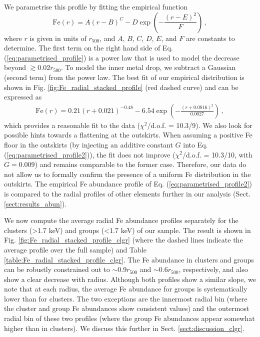 \documentclass{aa}
\begin{document}
We parametrise this profile by fitting the empirical function
\begin{equation}
\label{eq:parametrised_profile}
\text{Fe}(r) = A (r-B)^{C} - D \exp \left( -\frac{(r-E)^2}{F} \right) \, ,
\end{equation}
where $r$ is given in units of $r_{500}$, and $A$, $B$, $C$, $D$, $E$, and $F$ are constants to determine. The first term on the right hand side of Eq. (\ref{eq:parametrised_profile}) is a power law that is used to model the decrease beyond $\gtrsim$0.02$r_{500}$. To model the inner metal drop, we subtract a Gaussian (second term) from the power law. The best fit of our empirical distribution is shown in Fig. \ref{fig:Fe_radial_stacked_profile} (red dashed curve) and can be expressed as
\begin{align}
\label{eq:parametrised_profile2}
\text{Fe}(r) = 0.21 (r+0.021)^{-0.48} - 6.54 \exp \left( -\frac{(r+0.0816)^2}{0.0027} \right) \, ,
\end{align}
which provides a reasonable fit to the data ($\chi^2$/d.o.f. = 10.3/9). We also look for possible hints towards a flattening at  the outskirts. When assuming a positive Fe floor in the outskirts (by injecting an additive constant $G$ into Eq. (\ref{eq:parametrised_profile2})), the fit does not improve ($\chi^2$/d.o.f. = 10.3/10, with $G=0.009$) and remains comparable to the former case. Therefore, our data do not allow us to formally confirm the presence of a uniform Fe distribution in the outskirts. The empirical Fe abundance profile of Eq. (\ref{eq:parametrised_profile2}) is compared to the radial profiles of other elements further in our analysis (Sect. \ref{sect:results_abun}).


We now compute the average radial Fe abundance profiles separately for the clusters (>1.7 keV) and groups (<1.7 keV) of our sample. The result is shown in Fig. \ref{fig:Fe_radial_stacked_profile_clgr} (where the dashed lines indicate the average profile over the full sample) and Table \ref{table:Fe_radial_stacked_profile_clgr}. The Fe abundance in clusters and groups can be robustly constrained out to $\sim$$0.9 r_{500}$ and $\sim$$0.6 r_{500}$, respectively, and also show a clear decrease with radius. Although both profiles show a similar slope, we note that at each radius, the average Fe abundance for groups is systematically lower than for clusters. The two exceptions are the innermost radial bin (where the cluster and group Fe abundances show consistent values) and the outermost radial bin of these two profiles (where the group Fe abundances appear somewhat higher than in clusters). We discuss this further in Sect. \ref{sect:discussion_clgr}.
\end{document}
